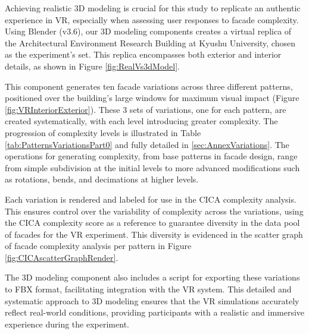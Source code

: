 %    



Achieving realistic 3D modeling is crucial for this study to replicate an authentic experience in VR, especially when assessing user responses to facade complexity.
Using Blender (v3.6), our 3D modeling components creates a virtual replica of the Architectural Environment Research Building at Kyushu University, chosen as the experiment's set.
This replica encompasses both exterior and interior details, as shown in Figure \ref{fig:RealVs3dModel}.

This component generates ten facade variations across three different patterns, positioned over the building's large windows for maximum visual impact (Figure \ref{fig:VRInteriorExterior}). These 3 sets of variations, one for each pattern, are created systematically, with each level introducing greater complexity.
The progression of complexity levels is illustrated in Table \ref{tab:PatternsVariationsPart0} and fully detailed in \ref{sec:AnnexVariations}.
The operations for generating complexity, from base patterns in facade design, range from simple subdivision at the initial levels to more advanced modifications such as rotations, bends, and decimations at higher levels.

Each variation is rendered and labeled for use in the CICA complexity analysis.
This ensures control over the variability of complexity across the variations, using the CICA complexity score as a reference to guarantee diversity in the data pool of facades for the VR experiment.
This diversity is evidenced in the scatter graph of facade complexity analysis per pattern in Figure \ref{fig:CICAscatterGraphRender}.

The 3D modeling component also includes a script for exporting these variations to FBX format, facilitating integration with the VR system.
This detailed and systematic approach to 3D modeling ensures that the VR simulations accurately reflect real-world conditions, providing participants with a realistic and immersive experience during the experiment.


